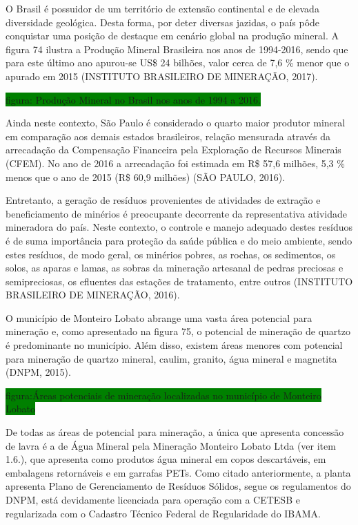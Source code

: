 	O Brasil é possuidor de um território de extensão continental e de elevada diversidade geológica. Desta forma, por deter diversas jazidas, o país pôde conquistar uma posição de destaque em cenário global na produção mineral. A figura 74 ilustra a Produção Mineral Brasileira nos anos de 1994-2016, sendo que para este último ano apurou-se US\$ 24 bilhões, valor cerca de 7,6 \% menor que o apurado em 2015 (INSTITUTO BRASILEIRO DE MINERAÇÃO, 2017).
	
	\colorbox{green}{figura: Produção Mineral no Brasil nos anos de 1994 a 2016.}
	
	Ainda neste contexto, São Paulo é considerado o quarto maior produtor mineral em comparação aos demais estados brasileiros, relação mensurada através da arrecadação da Compensação Financeira pela Exploração de Recursos Minerais (CFEM). No ano de 2016 a arrecadação foi estimada em R\$ 57,6 milhões, 5,3 \% menos que o ano de 2015 (R\$ 60,9 milhões) (SÃO PAULO, 2016).

	Entretanto, a geração de resíduos provenientes de atividades de extração e beneficiamento de minérios é preocupante decorrente da representativa atividade mineradora do país. Neste contexto, o controle e manejo adequado destes resíduos é de suma importância para proteção da saúde pública e do meio ambiente, sendo estes resíduos, de modo geral, os minérios pobres, as rochas, os sedimentos, os solos, as aparas e lamas, as sobras da mineração artesanal de pedras preciosas e semipreciosas, os efluentes das estações de tratamento, entre outros (INSTITUTO BRASILEIRO DE MINERAÇÃO, 2016). 
	
	O município de Monteiro Lobato abrange uma vasta área potencial para mineração e, como apresentado na figura 75, o potencial de mineração de quartzo é predominante no município. Além disso, existem áreas menores com potencial para mineração de quartzo mineral, caulim, granito, água mineral e magnetita (DNPM, 2015).
	
	\colorbox{green}{figura:Áreas potenciais de mineração localizadas no município de Monteiro Lobato}

	De todas as áreas de potencial para mineração, a única que apresenta concessão de lavra é a de Água Mineral pela Mineração Monteiro Lobato Ltda (ver item 1.6.), que apresenta como produtos água mineral em copos descartáveis, em embalagens retornáveis e em garrafas PETs. Como citado anteriormente, a planta apresenta Plano de Gerenciamento de Resíduos Sólidos, segue os regulamentos do DNPM, está devidamente licenciada para operação com a CETESB e regularizada com o Cadastro Técnico Federal de Regularidade do IBAMA.
	
